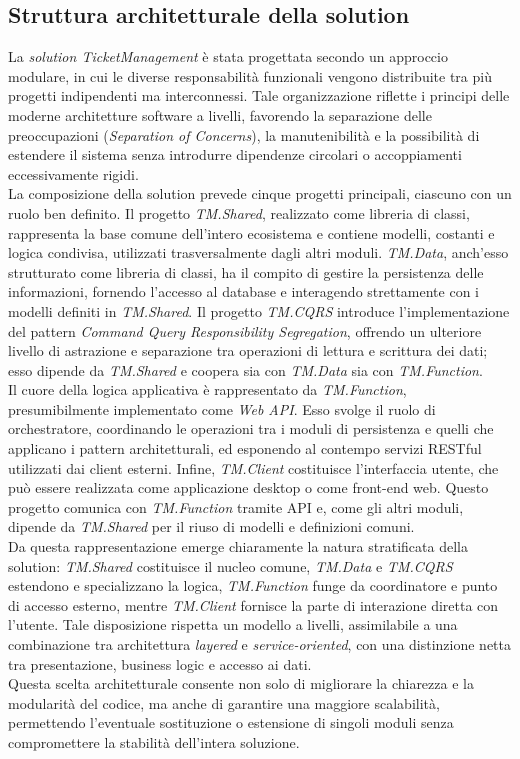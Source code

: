 \subsection{Struttura architetturale della solution}
La \textit{solution TicketManagement} è stata progettata secondo un approccio modulare, in cui le diverse responsabilità funzionali vengono distribuite tra più progetti indipendenti ma interconnessi. Tale organizzazione riflette i principi delle moderne architetture software a livelli, favorendo la separazione delle preoccupazioni (\textit{Separation of Concerns}), la manutenibilità e la possibilità di estendere il sistema senza introdurre dipendenze circolari o accoppiamenti eccessivamente rigidi.
\\
La composizione della solution prevede cinque progetti principali, ciascuno con un ruolo ben definito. Il progetto \textit{TM.Shared}, realizzato come libreria di classi, rappresenta la base comune dell'intero ecosistema e contiene modelli, costanti e logica condivisa, utilizzati trasversalmente dagli altri moduli. \textit{TM.Data}, anch'esso strutturato come libreria di classi, ha il compito di gestire la persistenza delle informazioni, fornendo l'accesso al database e interagendo strettamente con i modelli definiti in \textit{TM.Shared}. Il progetto \textit{TM.CQRS} introduce l'implementazione del pattern \textit{Command Query Responsibility Segregation}, offrendo un ulteriore livello di astrazione e separazione tra operazioni di lettura e scrittura dei dati; esso dipende da \textit{TM.Shared} e coopera sia con \textit{TM.Data} sia con \textit{TM.Function}.
\\
Il cuore della logica applicativa è rappresentato da \textit{TM.Function}, presumibilmente implementato come \textit{Web API}. Esso svolge il ruolo di orchestratore, coordinando le operazioni tra i moduli di persistenza e quelli che applicano i pattern architetturali, ed esponendo al contempo servizi RESTful utilizzati dai client esterni. Infine, \textit{TM.Client} costituisce l'interfaccia utente, che può essere realizzata come applicazione desktop o come front-end web. Questo progetto comunica con \textit{TM.Function} tramite API e, come gli altri moduli, dipende da \textit{TM.Shared} per il riuso di modelli e definizioni comuni.
\\
Da questa rappresentazione emerge chiaramente la natura stratificata della solution: \textit{TM.Shared} costituisce il nucleo comune, \textit{TM.Data} e \textit{TM.CQRS} estendono e specializzano la logica, \textit{TM.Function} funge da coordinatore e punto di accesso esterno, mentre \textit{TM.Client} fornisce la parte di interazione diretta con l'utente. Tale disposizione rispetta un modello a livelli, assimilabile a una combinazione tra architettura \textit{layered} e \textit{service-oriented}, con una distinzione netta tra presentazione, business logic e accesso ai dati.
\\
Questa scelta architetturale consente non solo di migliorare la chiarezza e la modularità del codice, ma anche di garantire una maggiore scalabilità, permettendo l'eventuale sostituzione o estensione di singoli moduli senza compromettere la stabilità dell'intera soluzione.
